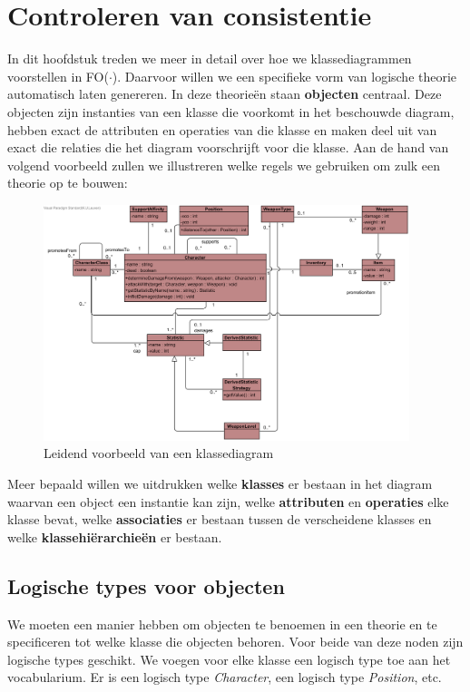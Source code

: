 \chapter{Controleren van consistentie}\label{sec:consistentie}
In dit hoofdstuk treden we meer in detail over hoe we klassediagrammen voorstellen in FO($\cdot$). Daarvoor willen we een specifieke vorm van logische theorie automatisch laten genereren. In deze theorie\"en staan \textbf{objecten} centraal. Deze objecten zijn instanties van een klasse die voorkomt in het beschouwde diagram, hebben exact de attributen en operaties van die klasse en maken deel uit van exact die relaties die het diagram voorschrijft voor die klasse. Aan de hand van volgend voorbeeld zullen we illustreren welke regels we gebruiken om zulk een theorie op te bouwen:

\begin{figure}[H]
	\includegraphics[width=0.95\textwidth]{chap-consistentie/diagram-voorbeeld.png}
	\caption{Leidend voorbeeld van een klassediagram}
	\label{fig:diagram-voorbeeld}
\end{figure}

Meer bepaald willen we uitdrukken welke \textbf{klasses} er bestaan in het diagram waarvan een object een instantie kan zijn, welke \textbf{attributen} en \textbf{operaties} elke klasse bevat, welke \textbf{associaties} er bestaan tussen de verscheidene klasses en welke \textbf{klassehi\"erarchie\"en} er bestaan.

\section{Logische types voor objecten}
We moeten een manier hebben om objecten te benoemen in een theorie en te specificeren tot welke klasse die objecten behoren. Voor beide van deze noden zijn logische types geschikt. We voegen voor elke klasse een logisch type toe aan het vocabularium. Er is een logisch type \textit{Character}, een logisch type \textit{Position}, etc.

